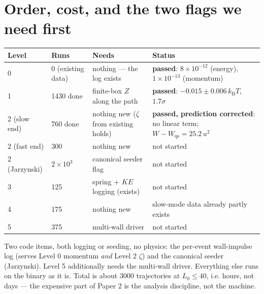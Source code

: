 \documentclass[11pt,a4paper]{article}
\newcommand{\kT}{k_{\mathrm B}T}
\begin{document}
\section{Order, cost, and the two flags we need first}
\begin{center}
\footnotesize
\begin{tabular}{@{}llll@{}}
\toprule
Level & Runs & Needs & Status \\
\midrule
0 & 0 (existing data) & nothing --- the log exists & \textbf{passed}: $8\times10^{-12}$ (energy), $1\times10^{-13}$ (momentum) \\
1 & 1430 done & finite-box $Z$ along the path & \textbf{passed}: $-0.015 \pm 0.006\,\kT$, $1.7\sigma$ \\
2 (slow end) & 760 done & nothing new ($\zeta$ from existing holds) & \textbf{passed, prediction corrected}: no linear term; $W - W_{\mathrm{qs}} = 25.2\,u^2$ \\
2 (fast end) & 300 & nothing new & not started \\
2 (Jarzynski) & $2\times10^3$ & canonical seeder flag & not started \\
3 & 125 & spring + $KE$ logging (exists) & not started \\
4 & 175 & nothing new & slow-mode data already partly exists \\
5 & 375 & multi-wall driver & not started \\
\bottomrule
\end{tabular}
\end{center}
Two code items, both logging or seeding, no physics: the per-event wall-impulse log (serves Level 0 momentum \emph{and} Level 2 $\zeta$) and the canonical seeder (Jarzynski). Level 5 additionally needs the multi-wall driver. Everything else runs on the binary as it is. Total is about 3000 trajectories at $L_0 \le 40$, i.e. hours, not days --- the expensive part of Paper 2 is the analysis discipline, not the machine.
\end{document}
